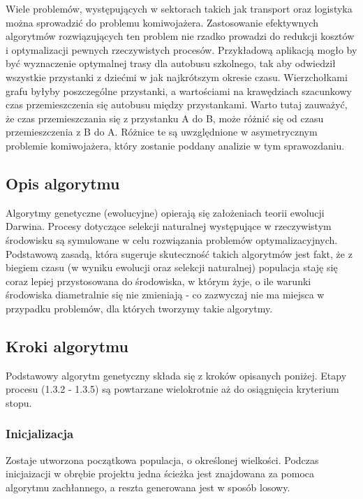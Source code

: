 \documentclass[a4paper,11pt]{article}
\begin{document}
Wiele problemów, występujących w sektorach takich jak transport oraz logistyka można sprowadzić
do problemu komiwojażera. Zastosowanie efektywnych algorytmów rozwiązujących ten problem nie
rzadko prowadzi do redukcji kosztów i optymalizacji pewnych rzeczywistych procesów. Przykładową
aplikacją mogło by być wyznaczenie optymalnej trasy dla autobusu szkolnego, tak aby odwiedził
wszystkie przystanki z dziećmi w jak najkrótszym okresie czasu. Wierzchołkami grafu byłyby
poszczególne przystanki, a wartościami na krawędziach szacunkowy czas przemieszczenia się autobusu
między przystankami. Warto tutaj zauważyć, że czas przemieszczania się z przystanku A do B, może
różnić się od czasu przemieszczenia z B do A. Różnice te są uwzględnione w asymetrycznym problemie
komiwojażera, który zostanie poddany analizie w tym sprawozdaniu.

\subsection{Opis algorytmu}

Algorytmy genetyczne (ewolucyjne) opierają się założeniach teorii ewolucji Darwina. Procesy dotyczące selekcji naturalnej występujące w rzeczywistym środowisku są symulowane w celu rozwiązania problemów optymalizacyjnych. Podstawową zasadą, która sugeruje skuteczność takich algorytmów jest fakt, że z biegiem czasu (w wyniku ewolucji oraz selekcji naturalnej) populacja staję się coraz lepiej przystosowana do środowiska, w którym żyje, o ile warunki środowiska diametralnie się nie zmieniają - co zazwyczaj nie ma miejsca w przypadku problemów, dla których tworzymy takie algorytmy. 

\subsection{Kroki algorytmu}

Podstawowy algorytm genetyczny składa się z kroków opisanych poniżej. Etapy procesu (1.3.2 - 1.3.5) są powtarzane wielokrotnie aż do osiągnięcia kryterium stopu.

\subsubsection{Inicjalizacja}

Zostaje utworzona początkowa populacja, o określonej wielkości. Podczas inicjaizacji w obrębie projektu jedna ścieżka jest znajdowana za pomoca algorytmu zachłannego, a reszta generowana jest w sposób losowy.
\end{document}

